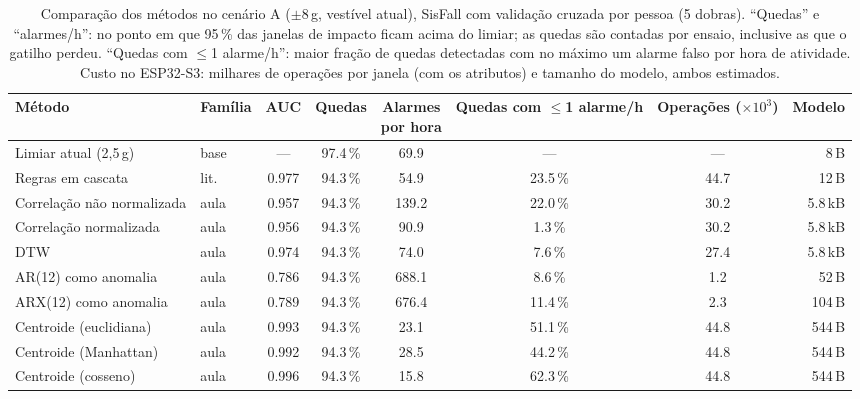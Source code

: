 \begin{table}[H]
\centering
\caption{Comparação dos métodos no cenário A ($\pm$8\,g, vestível atual), SisFall com validação cruzada por pessoa (5 dobras). ``Quedas'' e ``alarmes/h'': no ponto em que 95\,\% das janelas de impacto ficam acima do limiar; as quedas são contadas por ensaio, inclusive as que o gatilho perdeu. ``Quedas com $\le$1 alarme/h'': maior fração de quedas detectadas com no máximo um alarme falso por hora de atividade. Custo no ESP32-S3: milhares de operações por janela (com os atributos) e tamanho do modelo, ambos estimados.}
\label{tab:comparacao_A}
\footnotesize
\setlength{\tabcolsep}{4pt}
\begin{tabular}{@{}llcccccr@{}}
\toprule
Método & Família & AUC & Quedas & \makecell{Alarmes\\por hora} & \makecell{Quedas com\\$\le$1 alarme/h} & \makecell{Operações\\($\times10^3$)} & Modelo \\
\midrule
Limiar atual (2,5\,g) & base & --- & \num{97.4}\,\% & \num{69.9} & --- & --- & \num{8}\,B \\
\midrule
Regras em cascata & lit. & \num{0.977} & \num{94.3}\,\% & \num{54.9} & \num{23.5}\,\% & \num{44.7} & \num{12}\,B \\
\midrule
Correlação não normalizada & aula & \num{0.957} & \num{94.3}\,\% & \num{139.2} & \num{22.0}\,\% & \num{30.2} & \num{5.8}\,kB \\
Correlação normalizada & aula & \num{0.956} & \num{94.3}\,\% & \num{90.9} & \num{1.3}\,\% & \num{30.2} & \num{5.8}\,kB \\
DTW & aula & \num{0.974} & \num{94.3}\,\% & \num{74.0} & \num{7.6}\,\% & \num{27.4} & \num{5.8}\,kB \\
AR(12) como anomalia & aula & \num{0.786} & \num{94.3}\,\% & \num{688.1} & \num{8.6}\,\% & \num{1.2} & \num{52}\,B \\
ARX(12) como anomalia & aula & \num{0.789} & \num{94.3}\,\% & \num{676.4} & \num{11.4}\,\% & \num{2.3} & \num{104}\,B \\
Centroide (euclidiana) & aula & \num{0.993} & \num{94.3}\,\% & \num{23.1} & \num{51.1}\,\% & \num{44.8} & \num{544}\,B \\
Centroide (Manhattan) & aula & \num{0.992} & \num{94.3}\,\% & \num{28.5} & \num{44.2}\,\% & \num{44.8} & \num{544}\,B \\
Centroide (cosseno) & aula & \num{0.996} & \num{94.3}\,\% & \num{15.8} & \num{62.3}\,\% & \num{44.8} & \num{544}\,B \\

\end{tabular}
\end{table}
